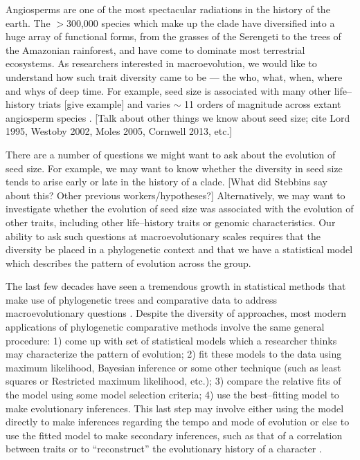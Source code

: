 \documentclass[12pt]{article}
\begin{document}
\noindent Angiosperms are one of the most spectacular radiations in the history of the earth. The $>$300,000 species which make up the clade have diversified into a huge array of functional forms, from the grasses of the Serengeti to the trees of the Amazonian rainforest, and have come to dominate most terrestrial ecosystems. As researchers interested in macroevolution, we would like to understand how such trait diversity came to be --- the who, what, when, where and whys of deep time. For example, seed size is associated with many other life--history triats [give example] and varies $\sim$ 11 orders of magnitude across extant angiosperm species \citep{Westoby1992TREE, Moles2005}. [Talk about other things we know about seed size; cite Lord 1995, Westoby 2002, Moles 2005, Cornwell 2013, etc.]

There are a number of questions we might want to ask about the evolution of seed size. For example, we may want to know whether the diversity in seed size tends to arise early or late in the history of a clade. [What did Stebbins say about this? Other previous workers/hypotheses?] Alternatively, we may want to investigate whether the evolution of seed size was associated with the evolution of other traits, including other life--history traits or genomic characteristics. Our ability to ask such questions at macroevolutionary scales requires that the diversity be placed in a phylogenetic context and that we have a statistical model which describes the pattern of evolution across the group.

The last few decades have seen a tremendous growth in statistical methods that make use of phylogenetic trees and comparative data to address macroevolutionary questions \citep[for recent reviews, see][]{Omeara2012, PennellHarmon}. Despite the diversity of approaches, most modern applications of phylogenetic comparative methods involve the same general procedure: 1) come up with set of statistical models which a researcher thinks may characterize the pattern of evolution; 2) fit these models to the data using maximum likelihood, Bayesian inference or some other technique (such as least squares or Restricted maximum likelihood, etc.); 3) compare the relative fits of the model using some model selection criteria; 4) use the best--fitting model to make evolutionary inferences. This last step may involve either using the model directly to make inferences regarding the tempo and mode of evolution \citep[e.g.][]{HansenMartins1996, Mooers1999, Harmon2010, Hunt2012} or else to use the fitted model to make secondary inferences, such as that of a correlation between traits \citep[e.g.][]{Felsenstein1985, Grafen1989, Freckleton2009} or to ``reconstruct'' the evolutionary history of a character \citep[e.g.][]{Schluter1997, Huelsenbeck2003}.
\end{document}

